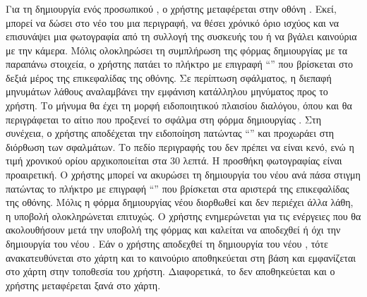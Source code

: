 \subsubsection{}
Για τη δημιουργία ενός προσωπικού , ο χρήστης μεταφέρεται στην οθόνη . Εκεί, μπορεί να δώσει στο νέο του  μια περιγραφή, να θέσει χρόνικό όριο ισχύος και να επισυνάψει μια φωτογραφία από τη συλλογή της συσκευής του ή να βγάλει καινούρια με την κάμερα. Μόλις ολοκληρώσει τη συμπλήρωση της φόρμας δημιουργίας με τα παραπάνω στοιχεία, ο χρήστης πατάει το πλήκτρο με επιγραφή ``\textit{}'' που βρίσκεται στο δεξιά μέρος της επικεφαλίδας της οθόνης.
\newline
\indent
Σε περίπτωση σφάλματος, η διεπαφή μηνυμάτων λάθους αναλαμβάνει την εμφάνιση κατάλληλου μηνύματος προς το χρήστη. Το μήνυμα θα έχει τη μορφή ειδοποιητικού πλαισίου διαλόγου, όπου και θα περιγράφεται το αίτιο που προξενεί το σφάλμα στη φόρμα δημιουργίας . Στη συνέχεια, ο χρήστης αποδέχεται την ειδοποίηση πατώντας ``\textit{}'' και προχωράει στη διόρθωση των σφαλμάτων. Το πεδίο περιγραφής του  δεν πρέπει να είναι κενό, ενώ η τιμή χρονικού ορίου αρχικοποιείται στα 30 λεπτά. Η προσθήκη φωτογραφίας είναι προαιρετική. Ο χρήστης μπορεί να ακυρώσει τη δημιουργία του νέου  ανά πάσα στιγμη πατώντας το πλήκτρο με επιγραφή ``\textit{}'' που βρίσκεται στα αριστερά της επικεφαλίδας της οθόνης.
\newline
\indent
Μόλις η φόρμα δημιουργίας νέου  διορθωθεί και δεν περιέχει άλλα λάθη, η υποβολή ολοκληρώνεται επιτυχώς. Ο χρήστης ενημερώνεται για τις ενέργειες που θα ακολουθήσουν μετά την υποβολή της φόρμας και καλείται να αποδεχθεί ή όχι την δημιουργία του νέου . Εάν ο χρήστης αποδεχθεί τη δημιουργία του νέου , τότε ανακατευθύνεται στο χάρτη και το καινούριο  αποθηκεύεται στη βάση και εμφανίζεται στο χάρτη στην τοποθεσία του χρήστη. Διαφορετικά, το  δεν αποθηκεύεται και ο χρήστης μεταφέρεται ξανά στο χάρτη.



